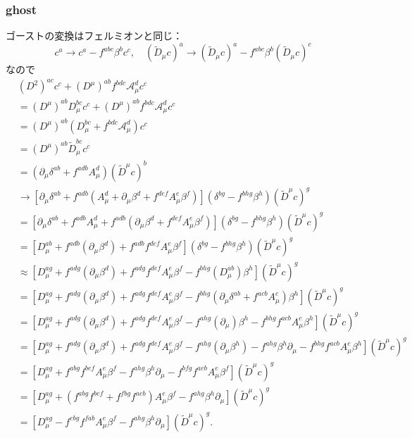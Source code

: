 \subsubsection{ghost}
ゴーストの変換はフェルミオンと同じ：
\[
c^a \to c^a - f^{abc} \beta^b c^c , \quad
(\tilde{D}_\mu c)^a \to (\tilde{D}_\mu c)^a - f^{abc} \beta^b (\tilde{D}_\mu c)^c
\]
なので
\begin{align*}
  & (D^2)^{ac} c^c + (D^\mu)^{ab} f^{bdc} \mathcal{A}_\mu^d c^c \\
  &= (D^\mu)^{ab} D_\mu^{bc} c^c + (D^\mu)^{ab} f^{bdc} \mathcal{A}_\mu^d c^c \\
  &= (D^\mu)^{ab} (D_\mu^{bc} + f^{bdc} \mathcal{A}_\mu^d) c^c \\
  &= (D^\mu)^{ab} \tilde{D}_\mu^{bc} c^c \\
  &= (\partial_\mu \delta^{ab} + f^{adb}A_\mu^d) (\tilde{D}^\mu c)^b \\
  &\to \left[ \partial_\mu \delta^{ab} + f^{adb} (A_\mu^d + \partial_\mu\beta^d + f^{def}A_\mu^e\beta^f) \right]
  (\delta^{bg} - f^{bhg}\beta^h) (\tilde{D}^\mu c)^g \\
  &= \left[ \partial_\mu \delta^{ab} + f^{adb} A_\mu^d + f^{adb} (\partial_\mu\beta^d + f^{def}A_\mu^e\beta^f) \right]
  (\delta^{bg} - f^{bhg}\beta^h) (\tilde{D}^\mu c)^g \\
  &= \left[ D_\mu^{ab}
  + f^{adb} (\partial_\mu\beta^d) + f^{adb}f^{def}A_\mu^e\beta^f \right]
  (\delta^{bg} - f^{bhg}\beta^h) (\tilde{D}^\mu c)^g \\
  &\approx \left[ D_\mu^{ag} + f^{adg} (\partial_\mu\beta^d) + f^{adg}f^{def}A_\mu^e\beta^f
  - f^{bhg} (D_\mu^{ab}) \beta^h \right] (\tilde{D}^\mu c)^g \\
  &= \left[ D_\mu^{ag} + f^{adg} (\partial_\mu\beta^d) + f^{adg}f^{def}A_\mu^e\beta^f
  - f^{bhg} (\partial_\mu\delta^{ab} + f^{acb}A_\mu^c)\beta^h \right] (\tilde{D}^\mu c)^g \\
  &= \left[ D_\mu^{ag} + f^{adg} (\partial_\mu\beta^d) + f^{adg}f^{def}A_\mu^e\beta^f
  - f^{ahg}(\partial_\mu)\beta^h - f^{bhg}f^{acb}A_\mu^c\beta^h \right] (\tilde{D}^\mu c)^g \\
  &= \left[ D_\mu^{ag} + f^{adg} (\partial_\mu\beta^d) + f^{adg}f^{def}A_\mu^e\beta^f
  - f^{ahg}(\partial_\mu\beta^h) - f^{ahg}\beta^h\partial_\mu - f^{bhg}f^{acb}A_\mu^c\beta^h \right] (\tilde{D}^\mu c)^g \\
  &= \left[ D_\mu^{ag} + f^{abg}f^{bef}A_\mu^e\beta^f
  - f^{ahg}\beta^h\partial_\mu - f^{bfg}f^{aeb}A_\mu^e\beta^f \right] (\tilde{D}^\mu c)^g \\
  &= \left[ D_\mu^{ag} + (f^{abg}f^{bef} + f^{fbg}f^{aeb}) A_\mu^e\beta^f
  - f^{ahg}\beta^h\partial_\mu \right] (\tilde{D}^\mu c)^g \\
  &= \left[ D_\mu^{ag} - f^{ebg}f^{fab} A_\mu^e\beta^f
  - f^{ahg}\beta^h\partial_\mu \right] (\tilde{D}^\mu c)^g .
\end{align*}
